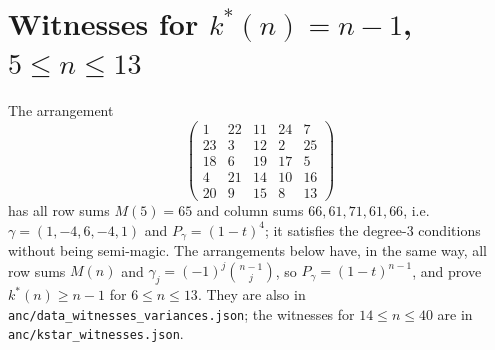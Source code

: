 \documentclass[11pt,a4paper]{article}
\theoremstyle{plain}
\theoremstyle{definition}
\theoremstyle{remark}
\begin{document}
\section{Witnesses for \texorpdfstring{$k^*(n)=n-1$, $5\le n\le13$}{k*(n)=n-1, 5<=n<=13}}
\label{sec:app_witnesses}

The arrangement
\[
\begin{pmatrix}1&22&11&24&7\\23&3&12&2&25\\18&6&19&17&5\\4&21&14&10&16\\20&9&15&8&13\end{pmatrix}
\]
has all row sums $M(5)=65$ and column sums $66,61,71,61,66$, i.e.\ $\gamma=(1,-4,6,-4,1)$ and $P_\gamma=(1-t)^4$; it satisfies the degree-$3$ conditions without being semi-magic.
The arrangements below have, in the same way, all row sums $M(n)$ and $\gamma_j=(-1)^j\binom{n-1}j$, so $P_\gamma=(1-t)^{n-1}$, and prove $k^*(n)\ge n-1$ for $6\le n\le13$.
They are also in \texttt{anc/data\_witnesses\_variances.json}; the witnesses for $14\le n\le40$ are in \texttt{anc/kstar\_witnesses.json}.
\end{document}
